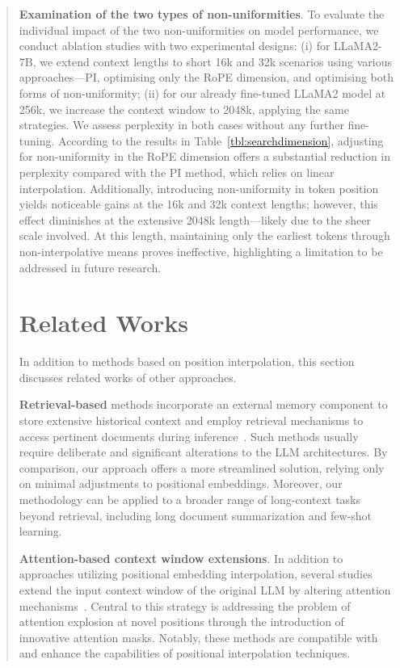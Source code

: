 \begin{abstract}
\textbf{Examination of the two types of non-uniformities}. To evaluate the individual impact of the two non-uniformities on model performance, we conduct ablation studies with two experimental designs: (i) for LLaMA2-7B, we extend context lengths to short 16k and 32k scenarios using various approaches—PI, optimising only the RoPE dimension, and optimising both forms of non-uniformity; (ii) for our already fine-tuned LLaMA2 model at 256k, we increase the context window to 2048k, applying the same strategies. We assess perplexity in both cases without any further fine-tuning. According to the results in Table~\ref{tbl:searchdimension}, adjusting for non-uniformity in the RoPE dimension offers a substantial reduction in perplexity compared with the PI method, which relies on linear interpolation. Additionally, introducing non-uniformity in token position yields noticeable gains at the 16k and 32k context lengths; however, this effect diminishes at the extensive 2048k length—likely due to the sheer scale involved. At this length, maintaining only the earliest tokens through non-interpolative means proves ineffective, highlighting a limitation to be addressed in future research.

\section{Related Works}

In addition to methods based on position interpolation, this section discusses related works of other approaches. 

\textbf{Retrieval-based} methods incorporate an external memory component to store extensive historical context and employ retrieval mechanisms to access pertinent documents during inference~\cite{longllama,wang2023augmenting,borgeaud2022improving}. Such methods usually require deliberate and significant alterations to the LLM architectures. By comparison, our approach offers a more streamlined solution, relying only on minimal adjustments to positional embeddings. Moreover, our methodology can be applied to a broader range of long-context tasks beyond retrieval, including long document summarization and few-shot learning.

\textbf{Attention-based context window extensions}. In addition to approaches utilizing positional embedding interpolation, several studies extend the input context window of the original LLM by altering attention mechanisms~\cite{han2023lminfinite, streamingllm,parallelwindow}. Central to this strategy is addressing the problem of attention explosion at novel positions through the introduction of innovative attention masks. Notably, these methods are compatible with and enhance the capabilities of positional interpolation techniques.


\end{abstract}
